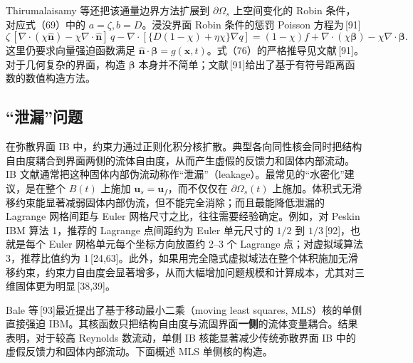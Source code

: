 \documentclass[UTF8,11pt,a4paper]{ctexart}
\begin{document}
Thirumalaisamy 等还把该通量边界方法扩展到 $\partial\Omega_s$ 上空间变化的 Robin 条件，对应式（69）中的 $a=\zeta,b=D$。浸没界面 Robin 条件的惩罚 Poisson 方程为\,[91]
\begin{equation}
\zeta\,[\nabla\cdot(\chi\hat{\bm n})-\chi\nabla\cdot\hat{\bm n}]\,q
-\nabla\cdot\left[\{D(1-\chi)+\eta\chi\}\nabla q\right]
=(1-\chi)f+\nabla\cdot(\chi\bm\beta)-\chi\nabla\cdot\bm\beta. \tag{76}
\end{equation}
这里仍要求向量强迫函数满足 $\hat{\bm n}\cdot\bm\beta=g(\bm x,t)$。式（76）的严格推导见文献\,[91]。对于几何复杂的界面，构造 $\bm\beta$ 本身并不简单；文献\,[91]给出了基于有符号距离函数的数值构造方法。

\subsection{“泄漏”问题}

在弥散界面 IB 中，约束力通过正则化积分核扩散。典型各向同性核会同时把结构自由度耦合到界面两侧的流体自由度，从而产生虚假的反馈力和固体内部流动。IB 文献通常把这种固体内部伪流动称作“泄漏”（leakage）。最常见的“水密化”建议，是在整个 $B(t)$ 上施加 $\bm u_s=\bm u_f$，而不仅仅在 $\partial\Omega_s(t)$ 上施加。体积式无滑移约束能显著减弱固体内部伪流，但不能完全消除；而且最能降低泄漏的 Lagrange 网格间距与 Euler 网格尺寸之比，往往需要经验确定。例如，对 Peskin IBM 算法 1，推荐的 Lagrange 点间距约为 Euler 单元尺寸的 $1/2$ 到 $1/3$\,[92]，也就是每个 Euler 网格单元每个坐标方向放置约 2--3 个 Lagrange 点；对虚拟域算法 3，推荐比值约为 1\,[24,63]。此外，如果用完全隐式虚拟域法在整个体积施加无滑移约束，约束力自由度会显著增多，从而大幅增加问题规模和计算成本，尤其对三维固体更为明显\,[38,39]。

Bale 等\,[93]最近提出了基于移动最小二乘（moving least squares, MLS）核的单侧直接强迫 IBM。其核函数只把结构自由度与流固界面\textbf{一侧}的流体变量耦合。结果表明，对于较高 Reynolds 数流动，单侧 IB 核能显著减少传统弥散界面 IB 中的虚假反馈力和固体内部流动。下面概述 MLS 单侧核的构造。
\end{document}
